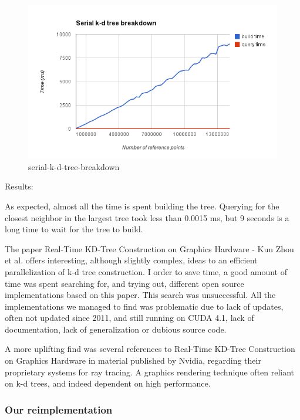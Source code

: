 \begin{figure}[ht!]
\centering
\includegraphics[width=120mm]{../gfx/serial-k-d-tree-breakdown.png}

\caption{serial-k-d-tree-breakdown}
\label{fig:serial_kd_tree_breakdown}
\end{figure}

Results:

As expected, almost all the time is spent building the tree. Querying for the closest neighbor in the largest tree took less than 0.0015 ms, but 9 seconds is a long time to wait for the tree to build.

The paper Real-Time KD-Tree Construction on Graphics Hardware - Kun Zhou et al. offers interesting, although slightly complex, ideas to an efficient parallelization of k-d tree construction. I order to save time, a good amount of time was spent searching for, and trying out, different open source implementations based on this paper. This search was unsuccessful. All the implementations we managed to find was problematic due to lack of updates, often not updated since 2011, and still running on CUDA 4.1, lack of documentation, lack of generalization or dubious source code.

A more uplifting find was several references to Real-Time KD-Tree Construction on Graphics Hardware in material published by Nvidia, regarding their proprietary systems for ray tracing. A graphics rendering technique often reliant on k-d trees, and indeed dependent on high performance.

\subsubsection{Our reimplementation} %
\label{ssub:our_reimplementation}

